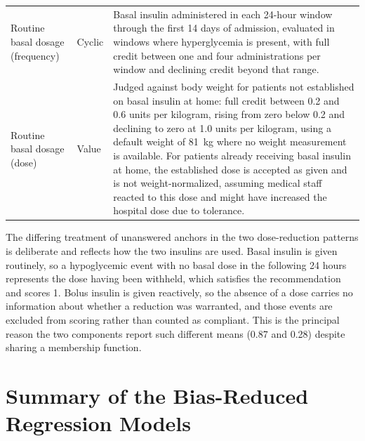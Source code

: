 \documentclass[11pt,a4paper]{article}
\begin{document}
\begin{longtable}{
>{\raggedright\arraybackslash}p{}
>{\centering\arraybackslash}p{}
>{\raggedright\arraybackslash}p{}
}
Routine basal dosage (frequency) & Cyclic &
Basal insulin administered in each 24-hour window through the first 14 days
of admission, evaluated in windows where hyperglycemia is present, with full
credit between one and four administrations per window and declining credit
beyond that range. \\

Routine basal dosage (dose) & Value &
Judged against body weight for patients not established on basal insulin at
home: full credit between 0.2 and 0.6 units per kilogram, rising from zero
below 0.2 and declining to zero at 1.0 units per kilogram, using a default
weight of 81~kg where no weight measurement is available. For patients
already receiving basal insulin at home, the established dose is accepted as
given and is not weight-normalized, assuming medical staff reacted to this
dose and might have increased the hospital dose due to tolerance. \\

\bottomrule
\end{longtable}

The differing treatment of unanswered anchors in the two dose-reduction
patterns is deliberate and reflects how the two insulins are used. Basal
insulin is given routinely, so a hypoglycemic event with no basal dose in the
following 24 hours represents the dose having been withheld, which satisfies
the recommendation and scores 1. Bolus insulin is given reactively, so the
absence of a dose carries no information about whether a reduction was
warranted, and those events are excluded from scoring rather than counted as
compliant. This is the principal reason the two components report such
different means (0.87 and 0.28) despite sharing a membership function.

\section{Summary of the Bias-Reduced Regression Models}
\end{document}
